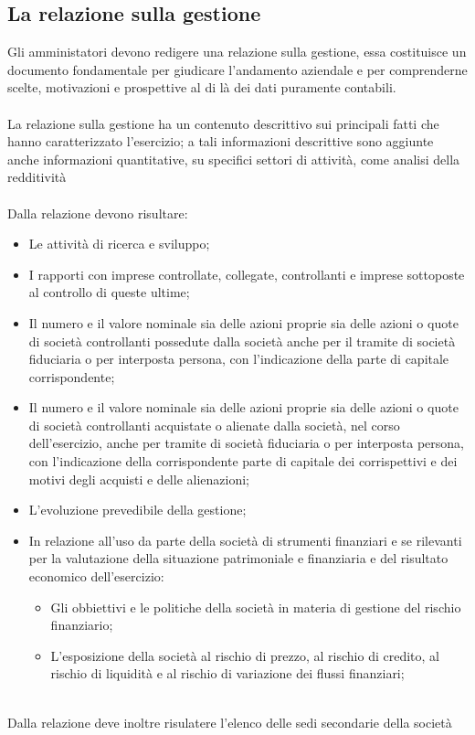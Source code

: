 \documentclass{report}
\begin{document}
\subsection{La relazione sulla gestione} %
\label{sub:La relazione sulla gestione}
Gli amministatori devono redigere una relazione sulla gestione, essa costituisce un documento fondamentale per giudicare l'andamento aziendale e per comprenderne scelte, motivazioni e prospettive al di là dei dati puramente contabili.
\\
\\
La relazione sulla gestione ha un contenuto descrittivo sui principali fatti che hanno caratterizzato l'esercizio; a tali informazioni descrittive sono aggiunte anche informazioni quantitative, su specifici settori di attività, come analisi della redditività
\\
\\
Dalla relazione devono risultare:
\\
\begin{itemize}
  \item{Le attività di ricerca e sviluppo;}
  \item{I rapporti con imprese controllate, collegate, controllanti e imprese sottoposte al controllo di queste ultime;}
  \item{Il numero e il valore nominale sia delle azioni proprie sia delle azioni o quote di società controllanti possedute dalla società anche per il tramite di società fiduciaria o per interposta persona, con l'indicazione della parte di capitale corrispondente;}
  \item{Il numero e il valore nominale sia delle azioni proprie sia delle azioni o quote di società controllanti acquistate o alienate dalla società, nel corso dell'esercizio, anche per tramite di società fiduciaria o per interposta persona, con l'indicazione della corrispondente parte di capitale dei corrispettivi e dei motivi degli acquisti e delle alienazioni;}
  \item{L'evoluzione prevedibile della gestione;}
  \item{In relazione all'uso da parte della società di strumenti finanziari e se rilevanti per la valutazione della situazione patrimoniale e finanziaria e del risultato economico dell'esercizio: 
    \begin{itemize}
      \item{Gli obbiettivi e le politiche della società in materia di gestione del rischio finanziario;}
      \item{L'esposizione della società al rischio di prezzo, al rischio di credito, al rischio di liquidità e al rischio di variazione dei flussi finanziari;}
    \end{itemize}}
\end{itemize}
\\
Dalla relazione deve inoltre risulatere l'elenco delle sedi secondarie della società
\end{document}
